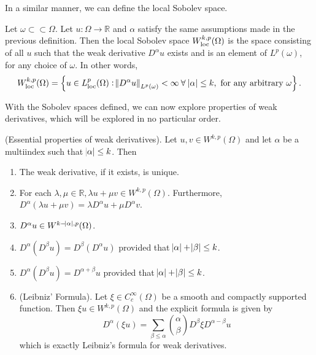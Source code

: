 \documentclass[10pt]{article}
\begin{document}
In a similar manner, we can define the local Sobolev space. 
\begin{definition}
	Let $\omega \subset\subset \Omega$. Let $u : \Omega \to \mathbb{R}$ and $\alpha$ satisfy the same assumptions made in the previous definition. Then the local Sobolev space $W_{\operatorname{loc}}^{k,p}(\Omega)$ is the space consisting of all $u$ such that the weak derivative $D^{\alpha}u$ exists and is an element of $L^p(\omega)$, for any choice of $\omega$. In other words, 
	 \begin{equation*}
	 	\displaystyle W_{\operatorname{loc}}^{k,p}(\Omega) = \left\{ u \in L_{\operatorname{loc}}^p(\Omega) : \norm{D^{\alpha}u}_{L^p(\omega)} < \infty \: \forall \: \abs{\alpha} \leq k, \textrm{ for any arbitrary } \omega\right\}.
	 \end{equation*}
\end{definition}
With the Sobolev spaces defined, we can now explore properties of weak derivatives, which will be explored in no particular order.
\begin{theorem}
	(Essential properties of weak derivatives). Let $u,v \in W^{k,p}(\Omega)$ and let $\alpha$ be a multiindex such that $\abs{\alpha} \leq k$. Then 
	\begin{enumerate}
		\item The weak derivative, if it exists, is unique. 
		\item For each $\lambda, \mu \in \mathbb{R}, \lambda u + \mu v \in W^{k,p}(\Omega)$. Furthermore, $D^{\alpha}(\lambda u + \mu v) = \lambda D^{\alpha} u + \mu D^{\alpha}v$.
		\item $D^{\alpha} u \in W^{k - \abs{\alpha},p}(\Omega)$.
		\item $D^{\alpha}(D^{\beta} u) = D^{\beta}(D^\alpha u)$ provided that $\abs{\alpha} + \abs{\beta} \leq k$.
		\item $D^{\alpha}(D^{\beta} u) = D^{\alpha + \beta}u$ provided that $\abs{\alpha} + \abs{\beta} \leq k$.
		\item (Leibniz' Formula). Let $\xi \in C_c^{\infty}(\Omega)$ be a smooth and compactly supported function. Then $\xi u \in W^{k,p}(\Omega)$ and the explicit formula is given by
		\begin{equation}
			\label{weak derivative, leibniz formula}
			\displaystyle D^\alpha (\xi u) = \sum\limits_{\beta \leq \alpha}{\binom{\alpha}{\beta}D^\beta\xi D^{\alpha - \beta}u}
		\end{equation}
		which is exactly Leibniz's formula for weak derivatives.  
	\end{enumerate}
\end{theorem}
\end{document}
